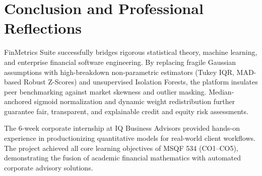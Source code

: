 
\section{Conclusion and Professional Reflections}

FinMetrics Suite successfully bridges rigorous statistical theory, machine learning, and enterprise financial software engineering. By replacing fragile Gaussian assumptions with high-breakdown non-parametric estimators (Tukey IQR, MAD-based Robust Z-Scores) and unsupervised Isolation Forests, the platform insulates peer benchmarking against market skewness and outlier masking. Median-anchored sigmoid normalization and dynamic weight redistribution further guarantee fair, transparent, and explainable credit and equity risk assessments.

The 6-week corporate internship at IQ Business Advisors provided hands-on experience in productionizing quantitative models for real-world client workflows. The project achieved all core learning objectives of MSQF 534 (CO1--CO5), demonstrating the fusion of academic financial mathematics with automated corporate advisory solutions.
